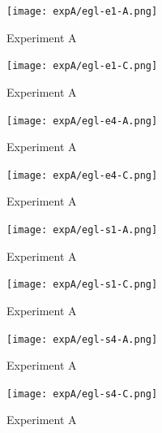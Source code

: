 \documentclass[twoside]{ctuthesis}
\theoremstyle{plain}
\theoremstyle{definition}
\theoremstyle{note}
\begin{document}
%
%	

\begin{figure}[htbp]
	\centering
	\texttt{[image: expA/egl-e1-A.png]}
	\caption{Experiment A}
	\label{fig:your-figure}
\end{figure}
\begin{figure}[htbp]
	\centering
	\texttt{[image: expA/egl-e1-C.png]}
	\caption{Experiment A}
	\label{fig:your-figure}
\end{figure}
\begin{figure}[htbp]
	\centering
	\texttt{[image: expA/egl-e4-A.png]}
	\caption{Experiment A}
	\label{fig:your-figure}
\end{figure}
\begin{figure}[htbp]
	\centering
	\texttt{[image: expA/egl-e4-C.png]}
	\caption{Experiment A}
	\label{fig:your-figure}
\end{figure}
\begin{figure}[htbp]
	\centering
	\texttt{[image: expA/egl-s1-A.png]}
	\caption{Experiment A}
	\label{fig:your-figure}
\end{figure}
\begin{figure}[htbp]
	\centering
	\texttt{[image: expA/egl-s1-C.png]}
	\caption{Experiment A}
	\label{fig:your-figure}
\end{figure}
\begin{figure}[htbp]
	\centering
	\texttt{[image: expA/egl-s4-A.png]}
	\caption{Experiment A}
	\label{fig:your-figure}
\end{figure}
\begin{figure}[htbp]
	\centering
	\texttt{[image: expA/egl-s4-C.png]}
	\caption{Experiment A}
	\label{fig:your-figure}
\end{figure}
\end{document}
